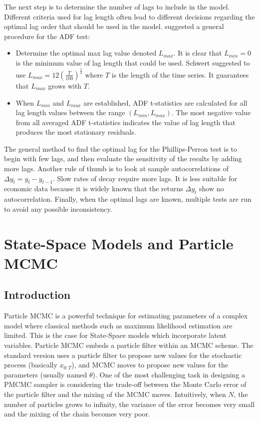 \documentclass[11pt,a4,twosided,singlespacing,titlepagenumber=on]{scrreprt}
\numberwithin{equation}{chapter} %
\theoremstyle{remark}
\begin{document}
\noindent
The next step is to determine the number of lags to include in the model. Different criteria used for lag length often lead to different decisions regarding the optimal lag order that should be used in the model. \cite{daoimpact} suggested a general procedure for the ADF test:
\begin{itemize}
\item Determine the optimal max lag value denoted $L_{max}$. It is clear that $L_{min} = 0$ is the minimum value of lag length that could be used. Schwert suggested to use $L_{max} = 12 \left(\frac{T}{100} \right)^{\frac{1}{4}}$ where $T$ is the length of the time series. It guarantees that $L_{max}$ grows with $T$.
\item When $L_{min}$ and $L_{max}$ are established, ADF t-statistics are calculated for all lag length values between the range $(L_{min}, L_{max})$. The most negative value from all averaged ADF t-statistics indicates the value of lag length that produces the most stationary residuals.
\end{itemize}
The general method to find the optimal lag for the Phillips-Perron test is to begin with few lags, and then evaluate the sensitivity of the results by adding more lags. Another rule of thumb is to look at sample autocorrelations of $\Delta y_t = y_t - y_{t-1}$. Slow rates of decay require more lags. It is less suitable for economic data because it is widely known that the returns $\Delta y_t$ show no autocorrelation. Finally, when the optimal lags are known, multiple tests are run to avoid any possible inconsistency.


\chapter{State-Space Models and Particle MCMC}

\section{Introduction}
Particle MCMC is a powerful technique for estimating parameters of a complex model where classical methods such as maximum likelihood estimation are limited. This is the case for State-Space models which incorporate latent variables. Particle MCMC embeds a particle filter within an MCMC scheme. The standard version uses a particle filter to propose new values for the stochastic process (basically $x_{0:T}$), and MCMC moves to propose new values for the parameters (usually named $\theta$). One of the most challenging task in designing a PMCMC sampler is considering the trade-off between the Monte Carlo error of the particle filter and the mixing of the MCMC moves. Intuitively, when $N$, the number of particles grows to infinity, the variance of the error becomes very small and the mixing of the chain becomes very poor.
\end{document}
